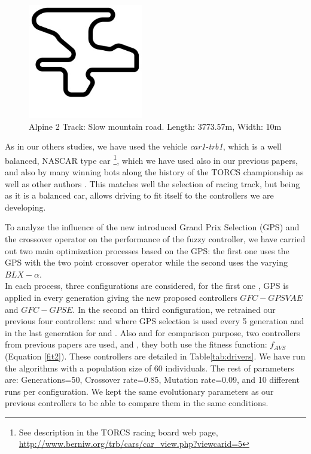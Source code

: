 \documentclass[10pt,journal,compsoc]{IEEEtran}
\begin{document}
\begin{figure}[!ht]	
	\begin{center}
		\includegraphics[width=5cm]{fig/alpine2.jpg}
		\caption{Alpine 2 Track: Slow mountain road. Length: 3773.57m, Width: 10m}
		\label{fig:alpine2_track}	
	\end{center}	
\end{figure}

As in our others studies, we have used the vehicle \textit{car1-trb1},
which is a well balanced, NASCAR type car \footnote{See description in
  the TORCS racing board web page,
  \url{http://www.berniw.org/trb/cars/car_view.php?viewcarid=5}},
which we have used also in our previous papers, and also by many
winning bots along the history of the TORCS championship
\cite{torcs5} as well as other authors
\cite{auteur2010,li2019reinforcement}. This matches well the selection
of racing track, but being as it is a balanced car, allows driving to
fit itself to the controllers we are developing.




To analyze the influence of the new introduced Grand Prix Selection (GPS) and the crossover operator on the performance of the fuzzy controller, we have carried out  two main optimization processes based on the GPS: the first one uses the GPS with the two point crossover operator while the second uses the varying $BLX-\alpha$. \\
In each process, three configurations are considered, for the first one , GPS is applied in every generation giving the new proposed controllers $GFC-GPSVAE$ and
$GFC-GPSE$. In the second an third configuration, we retrained our previous four  controllers\cite{DBLP:conf/cig/SalemMG19}: {} and 
{} where GPS selection is used every 5 generation and in the last generation for  {} and 
{}.
Also  and for comparison purpose, two controllers from previous papers are used, {}\cite{DBLP:conf/cig/SalemMG19} and {}\cite{salem_cig2018}, they both use the fitness function: $f_{AVS}$ (Equation \ref{fit2}).
These controllers are detailed in Table\ref{tab:drivers}. 
We have run the algorithms with a population size of 60
individuals. The rest of parameters are: Generations=50, Crossover
rate=0.85, Mutation rate=0.09, and 10 different runs per
configuration.  We kept the same evolutionary parameters as our previous controllers  to be able to compare them in the same conditions.
\end{document}
